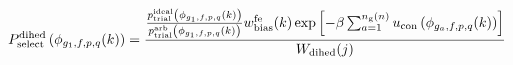\documentclass[12pt]{article}
\begin{document}
\begin{displaymath}
P_{\rm select}^{\rm dihed}\left(\phi_{g_1,f,p,q}(k)\right) = 
{
{
{{p_{\rm trial}^{\rm ideal}\left(\phi_{g_1,f,p,q}(k)\right)}\over{ p_{\rm trial}^{\rm arb}\left(\phi_{g_1,f,p,q}(k)\right)}}
w_{\rm bias}^{\rm fe}(k)
\exp\left[-\beta \sum_{a=1}^{n_{\rm g}(n)} u_{\rm con}\left(\phi_{g_a,f,p,q}(k)\right)\right]
}
\over
{
W_{\rm dihed}(j)
}
}
\end{displaymath}
\end{document}
